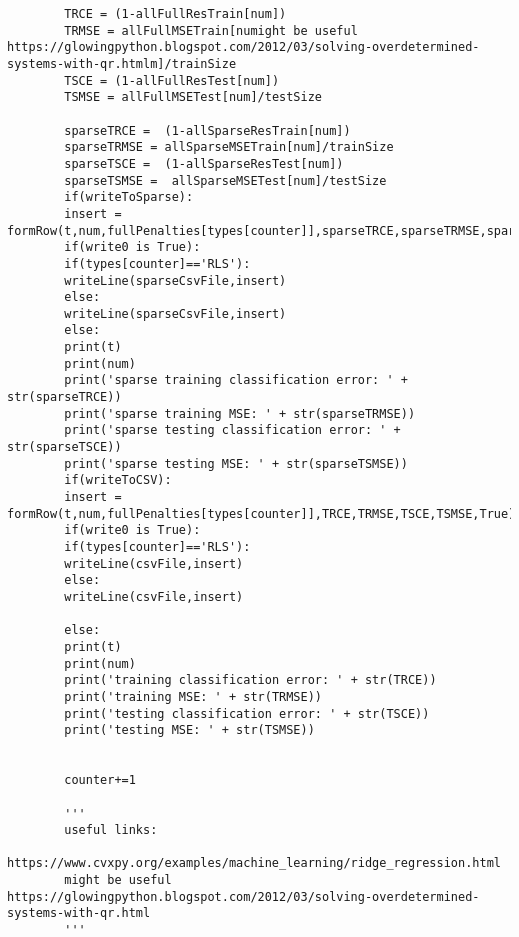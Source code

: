 \documentclass[12pt]{article}
\begin{document}
\begin{verbatim}
		TRCE = (1-allFullResTrain[num])
		TRMSE = allFullMSETrain[numight be useful https://glowingpython.blogspot.com/2012/03/solving-overdetermined-systems-with-qr.htmlm]/trainSize
		TSCE = (1-allFullResTest[num])
		TSMSE = allFullMSETest[num]/testSize
		
		sparseTRCE =  (1-allSparseResTrain[num])
		sparseTRMSE = allSparseMSETrain[num]/trainSize
		sparseTSCE =  (1-allSparseResTest[num])
		sparseTSMSE =  allSparseMSETest[num]/testSize
		if(writeToSparse):
		insert = formRow(t,num,fullPenalties[types[counter]],sparseTRCE,sparseTRMSE,sparseTSCE,sparseTSMSE,True)
		if(write0 is True):
		if(types[counter]=='RLS'):
		writeLine(sparseCsvFile,insert)
		else:
		writeLine(sparseCsvFile,insert)
		else:
		print(t)
		print(num)
		print('sparse training classification error: ' + str(sparseTRCE))
		print('sparse training MSE: ' + str(sparseTRMSE))
		print('sparse testing classification error: ' + str(sparseTSCE))
		print('sparse testing MSE: ' + str(sparseTSMSE))
		if(writeToCSV):
		insert = formRow(t,num,fullPenalties[types[counter]],TRCE,TRMSE,TSCE,TSMSE,True)
		if(write0 is True):
		if(types[counter]=='RLS'):
		writeLine(csvFile,insert)
		else:
		writeLine(csvFile,insert)
		
		else:
		print(t)
		print(num)
		print('training classification error: ' + str(TRCE))
		print('training MSE: ' + str(TRMSE))
		print('testing classification error: ' + str(TSCE))
		print('testing MSE: ' + str(TSMSE))
		
		
		counter+=1
		
		'''
		useful links:
		https://www.cvxpy.org/examples/machine_learning/ridge_regression.html
		might be useful https://glowingpython.blogspot.com/2012/03/solving-overdetermined-systems-with-qr.html
		'''
		
	\end{verbatim}
\end{document}
